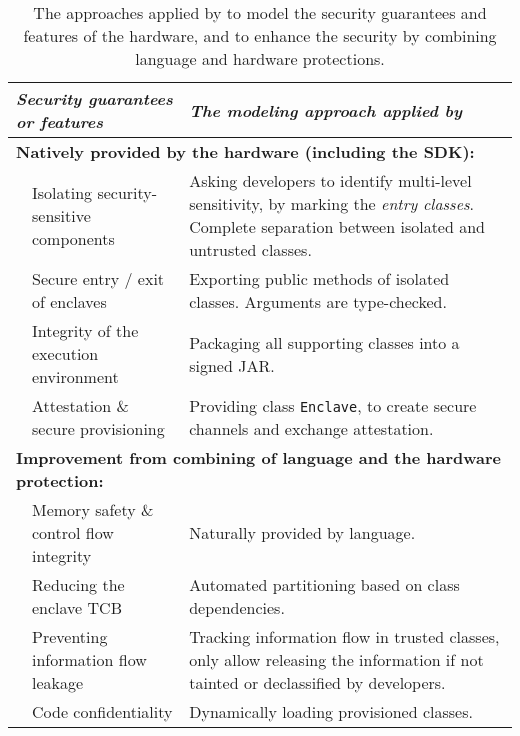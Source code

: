 \begin{table*}[t!b!]
\centering
  \begin{tabular}{p{0.05in} >{\raggedright\arraybackslash}p{2.05in} >{\raggedright\arraybackslash}p{4.4in}}
  \toprule
  \multicolumn{2}{l}{\it Security guarantees or features} & {\it The modeling approach applied by \systemname{}} \\
  \midrule
  \midrule
  \multicolumn{3}{l}{\bf Natively provided by the \sgx{} hardware (including the SDK):} \\
  \midrule
  & Isolating security-sensitive components &
  Asking developers to identify multi-level sensitivity, by marking the {\em entry classes}. Complete separation between isolated and untrusted classes.
  \\
  \midrule
  & Secure entry / exit of enclaves &
  Exporting public methods of isolated classes. Arguments are type-checked.
  \\
  \midrule
  & Integrity of the execution environment & 
  Packaging all supporting classes into a signed JAR.
  \\
  \midrule
  & Attestation \& secure provisioning & 
  Providing class {\tt Enclave}, to create secure channels and exchange attestation.
  \\
  \midrule
  \midrule
  \multicolumn{3}{l}{\bf Improvement from combining of \java{} language and the \sgx{} hardware protection:} \\
  \midrule
  & Memory safety \& control flow integrity &
  Naturally provided by \java{} language.
  \\
  \midrule
  & Reducing the enclave TCB &
  Automated partitioning based on class dependencies.
  \\
  \midrule
  & Preventing information flow leakage &
  Tracking information flow in trusted classes, only allow releasing the information if not tainted or declassified by developers.
  \\
  \midrule
  & Code confidentiality & Dynamically loading provisioned classes.
  \\
  \end{tabular}
  
\footnotesize
\caption{
The approaches applied by \systemname{} to model the security guarantees and features of the \sgx{} hardware, and to enhance the security by combining language and hardware protections.
}
\label{tab:features}
\end{table*}
